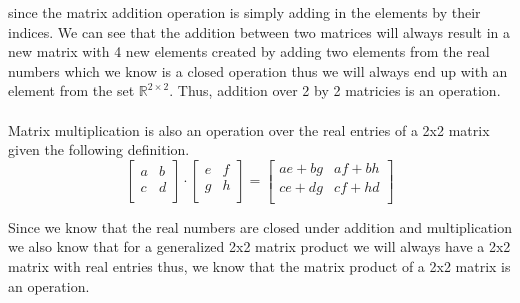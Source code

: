 \documentclass{article}
\begin{document}
        since the matrix addition operation is simply adding in the elements by their indices. We can see that the addition between two matrices will always result in a new matrix with 4 new elements created by adding two elements from the real numbers which we know is a closed operation thus we will always end up with an element from the set $\mathbb{R}^{2 \times 2}$. Thus, addition over 2 by 2 matricies is an operation.

        \paragraph{}
        Matrix multiplication is also an operation over the real entries of a 2x2 matrix given the following definition.
        \[
        \left[ {\begin{array}{cc}
            a & b \\
            c & d \\
        \end{array} } \right]
        \cdot
        \left[ {\begin{array}{cc}
            e & f \\
            g & h \\
        \end{array} } \right]
        = 
        \left[ {\begin{array}{cc}
            ae + bg & af + bh \\
            ce+dg & cf+hd \\
        \end{array} } \right]
        \]

        Since we know that the real numbers are closed under addition and multiplication we also know that for a generalized 2x2 matrix product we will always have a 2x2 matrix with real entries thus, we know that the matrix product of a 2x2 matrix is an operation.
\end{document}
